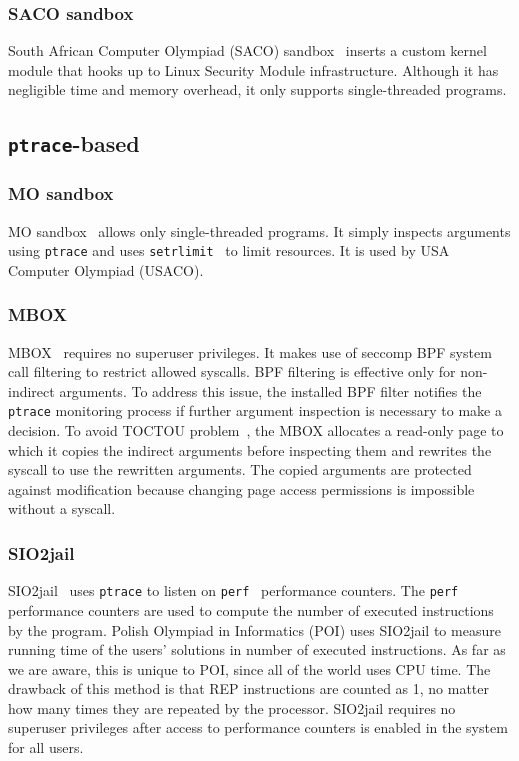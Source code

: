 \documentclass[en]{pracamgr}
\begin{document}
\subsubsection{SACO sandbox}

South African Computer Olympiad (SACO) sandbox~\cite{merry2009using} inserts a custom kernel module that hooks up to Linux Security Module infrastructure. Although it has negligible time and memory overhead, it only supports single-threaded programs.

\subsection{\texttt{ptrace}-based}

\subsubsection{MO sandbox}
MO sandbox~\cite{marevs2007perspectives, kolstad2009infrastructure} allows only single-threaded programs. It simply inspects arguments using \texttt{ptrace} and uses \texttt{setrlimit}~\cite{man_getrlimit_setrlimit_prlimit} to limit resources. It is used by USA Computer Olympiad (USACO).

\subsubsection{MBOX}
MBOX~\cite{kim2013practical} requires no superuser privileges. It makes use of seccomp BPF system call filtering to restrict allowed syscalls. BPF filtering is effective only for non-indirect arguments. To address this issue, the installed BPF filter notifies the \texttt{ptrace} monitoring process if further argument inspection is necessary to make a decision. To avoid TOCTOU problem~\cite{cwe_toctou}, the MBOX allocates a read-only page to which it copies the indirect arguments before inspecting them and rewrites the syscall to use the rewritten arguments. The copied arguments are protected against modification because changing page access permissions is impossible without a syscall.

\subsubsection{SIO2jail}
SIO2jail~\cite{sio2jail} uses \texttt{ptrace} to listen on \texttt{perf}~\cite{perf} performance counters. The \texttt{perf} performance counters are used to compute the number of executed instructions by the program. Polish Olympiad in Informatics (POI) uses SIO2jail to measure running time of the users' solutions in number of executed instructions. As far as we are aware, this is unique to POI, since all of the world uses CPU time. The drawback of this method is that REP instructions are counted as 1, no matter how many times they are repeated by the processor. SIO2jail requires no superuser privileges after access to performance counters is enabled in the system for all users.
\end{document}
